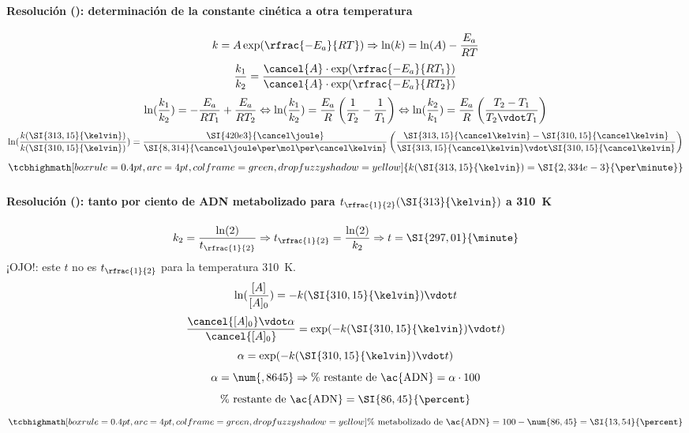 \begin{frame}
    \frametitle{\ejerciciocmd}
    \framesubtitle{Resolución (): determinación de la constante cinética a otra temperatura}
    $$
        k = A\exp(\rfrac{-E_a}{RT})\Rightarrow\ln(k)=\ln(A)-\frac{E_a}{RT}
    $$
    $$
        \frac{k_1}{k_2} = \frac{\cancel{A}\cdot\exp(\rfrac{-E_a}{RT_1})}{\cancel{A}\cdot\exp(\rfrac{-E_a}{RT_2})}
    $$
    $$
        \ln(\frac{k_1}{k_2}) = -\frac{E_a}{RT_1}+\frac{E_a}{RT_2}\Leftrightarrow\ln(\frac{k_1}{k_2}) = \frac{E_a}{R}\left(\frac{1}{T_2}-\frac{1}{T_1}\right)\Leftrightarrow
        \ln(\frac{k_2}{k_1}) = \frac{E_a}{R}\left(\frac{T_2 - T_1}{T_2\vdot T_1}\right)
    $$
    $$
        \ln(\frac{k(\SI{313,15}{\kelvin})}{k(\SI{310,15}{\kelvin})}) = \frac{\SI{420e3}{\cancel\joule}}{\SI{8,314}{\cancel\joule\per\mol\per\cancel\kelvin}}
        \left(\frac{\SI{313,15}{\cancel\kelvin}-\SI{310,15}{\cancel\kelvin}}{\SI{313,15}{\cancel\kelvin}\vdot\SI{310,15}{\cancel\kelvin}}\right)
    $$
    $$
        \tcbhighmath[boxrule=0.4pt,arc=4pt,colframe=green,drop fuzzy shadow=yellow]{k(\SI{313,15}{\kelvin})=\SI{2,334e-3}{\per\minute}}
    $$
\end{frame}

\begin{frame}
    \frametitle{\ejerciciocmd}
    \framesubtitle{Resolución (): tanto por ciento de \ac{ADN} metabolizado para $t_{\rfrac{1}{2}}(\SI{313}{\kelvin})$ a \SI{310}{\kelvin}}
    $$
        k_2 = \frac{\ln(2)}{t_{\rfrac{1}{2}}}\Rightarrow t_{\rfrac{1}{2}}=\frac{\ln(2)}{k_2}\Rightarrow t=\SI{297,01}{\minute}
    $$
    \alert{¡OJO!:} este $t$ no es $t_{\rfrac{1}{2}}$ para la temperatura \SI{310}{\kelvin}.
    $$
        \ln(\frac{[A]}{[A]_0}) = -k(\SI{310,15}{\kelvin})\vdot t
    $$
    $$
        \frac{\cancel{[A]_0}\vdot\alpha}{\cancel{[A]_0}}=\exp(-k(\SI{310,15}{\kelvin})\vdot t)
    $$
    $$
        \alpha = \exp(-k(\SI{310,15}{\kelvin})\vdot t)
    $$
    $$
        \alpha = \num{,8645}\Rightarrow \%~\text{restante de \ac{ADN}} = \alpha\cdot 100
    $$
    $$
        \%~\text{restante de \ac{ADN}} = \SI{86,45}{\percent}
    $$
	$$
	    \tcbhighmath[boxrule=0.4pt,arc=4pt,colframe=green,drop fuzzy shadow=yellow]{\%~\text{metabolizado de \ac{ADN}} = 100 - \num{86,45} = \SI{13,54}{\percent}}
	$$
\end{frame}
